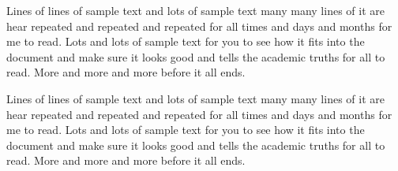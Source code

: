 Lines of lines of sample text and lots of sample text many many lines
of it are hear repeated and repeated and repeated for all times and days
and months for me to read.  Lots and lots of sample text for you to
see how it fits into the document and make sure it looks good and
tells the academic truths for all to read.  More and more and more
before it all ends.  

Lines of lines of sample text and lots of sample text many many lines
of it are hear repeated and repeated and repeated for all times and days
and months for me to read.  Lots and lots of sample text for you to
see how it fits into the document and make sure it looks good and
tells the academic truths for all to read.  More and more and more
before it all ends.  




